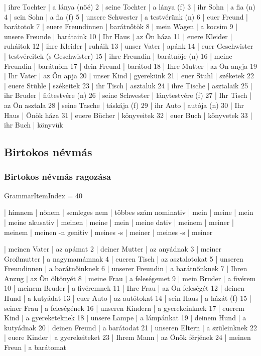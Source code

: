 \documentclass{article}
\newenvironment{desc}{\verbatim}{\endverbatim}
\newenvironment{exmp}{\verbatim}{\endverbatim}
\begin{document}
\begin{exmp}
1 | ihre Tochter | a lánya (nőé)
2 | seine Tochter | a lánya (f)
3 | ihr Sohn | a fia (n)
4 | sein Sohn | a fia (f)
5 | unsere Schwester | a testvérünk (n)
6 | euer Freund | barátotok
7 | euere Freundinnen | barátnőtök
8 | mein Wagen | a kocsim
9 | unsere Freunde | barátaink
10 | Ihr Haus | az Ön háza
11 | euere Kleider | ruháitok
12 | ihre Kleider | ruháik
13 | unser Vater | apánk
14 | euer Geschwister | testvéreitek (s Geschwister)
15 | ihre Freundin | barátnője (n)
16 | meine Freundin | barátnőm
17 | dein Freund | barátod
18 | Ihre Mutter | az Ön anyja
19 | Ihr Vater | az Ön apja
20 | unser Kind | gyerekünk
21 | euer Stuhl | széketek
22 | euere Stühle | székeitek
23 | ihr Tisch | asztaluk
24 | ihre Tische | asztalaik
25 | ihr Bruder | fiútestvére (n)
26 | seine Schwester | lánytestvére (f)
27 | Ihr Tisch | az Ön asztala
28 | seine Tasche | táskája (f)
29 | ihr Auto | autója (n)
30 | Ihr Haus | Önök háza
31 | euere Bücher | könyveitek
32 | euer Buch | könyvetek
33 | ihr Buch | könyvük
\end{exmp}

\subsection{Birtokos névmás}

\subsubsection{Birtokos névmás ragozása}

GrammarItemIndex = 40

\begin{desc}
          | hímnem    | nőnem  | semleges nem | többes szám 
nominativ | mein      | meine  | mein         | meine 
akusativ  | meinen    | meine  | mein         | meine 
dativ     | meinem    | meiner | meinem       | meinen -n 
genitiv   | meines -s | meiner | meines -s    | meiner 
\end{desc}

\begin{exmp}
1 | meinen Vater | az apámat
2 | deiner Mutter | az anyádnak
3 | meiner Großmutter | a nagymamámnak
4 | eueren Tisch | az asztalotokat
5 | unseren Freundinnen | a barátnőinknek
6 | unserer Freundin | a barátnőnknek
7 | Ihren Anzug | az Ön öltönyét
8 | meine Frau | a feleségemet
9 | mein Bruder | a fivérem
10 | meinem Bruder | a fivéremnek
11 | Ihre Frau | az Ön feleségét
12 | deinen Hund | a kutyádat
13 | euer Auto | az autótokat
14 | sein Haus | a házát (f)
15 | seiner Frau | a feleségének
16 | unseren Kindern | a gyerekeinknek
17 | euerem Kind | a gyereketeknek
18 | unsere Lampe | a lámpánkat
19 | deinem Hund | a kutyádnak
20 | deinen Freund | a barátodat
21 | unseren Eltern | a szüleinknek
22 | euere Kinder | a gyerekeiteket
23 | Ihrem Mann | az Önök férjének
24 | meinen Freun | a barátomat
\end{exmp}
\end{document}

